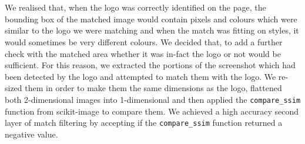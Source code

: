 \documentclass[12pt,twoside]{report}
\begin{document}
\\\\
We realised that, when the logo was correctly identified on the page, the bounding box of the matched image would contain pixels and colours which were similar to the logo we were matching and when the match was fitting on styles, it would sometimes be very different colours. We decided that, to add a further check with the matched area whether it was in-fact the logo or not would be sufficient. For this reason, we extracted the portions of the screenshot which had been detected by the logo and attempted to match them with the logo. We re-sized them in order to make them the same dimensions as the logo, flattened both 2-dimensional images into 1-dimensional and then applied the \texttt{compare\_ssim} function from scikit-image to compare them. We achieved a high accuracy second layer of match filtering by accepting if the \texttt{compare\_ssim} function returned a negative value.
\end{document}
